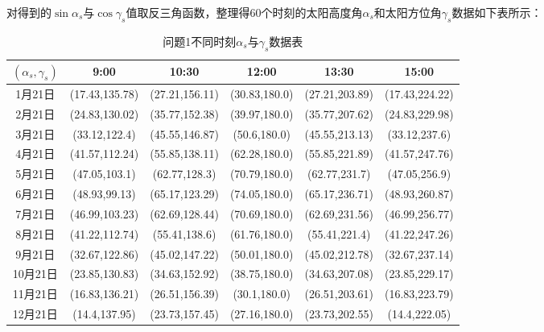 \documentclass{article}
\numberwithin{equation}{subsection}
\begin{document}
\vskip 0.25cm
对得到的$\sin \alpha_s$与$\cos \gamma_s$值取反三角函数，整理得60个时刻的太阳高度角$\alpha_s$和太阳方位角$\gamma_s$数据如下表所示：
\newpage
\begin{table}[!htbp]
    \centering
    \begin{tabular}{|c|c|c|c|c|c|}\hline
        $(\alpha_s,\gamma_s)$&9:00&10:30&12:00&13:30&15:00\\\hline
        1月21日&(17.43,135.78)&	(27.21,156.11)&	(30.83,180.0)&	(27.21,203.89)&	(17.43,224.22)\\
        2月21日&(24.83,130.02)&	(35.77,152.38)&	(39.97,180.0)&	(35.77,207.62)	&(24.83,229.98)\\
        3月21日&(33.12,122.4)&	(45.55,146.87)&	(50.6,180.0)	&(45.55,213.13)&	(33.12,237.6)\\
        4月21日&(41.57,112.24)&	(55.85,138.11)&	(62.28,180.0)&	(55.85,221.89)&	(41.57,247.76)\\
        5月21日&(47.05,103.1)&	(62.77,128.3)	&(70.79,180.0)	&(62.77,231.7)&	(47.05,256.9)\\
        6月21日&(48.93,99.13)&	(65.17,123.29)&	(74.05,180.0)&	(65.17,236.71)&	(48.93,260.87)\\
        7月21日&(46.99,103.23)&	(62.69,128.44)&	(70.69,180.0)&	(62.69,231.56)&	(46.99,256.77)\\
        8月21日&(41.22,112.74)&	(55.41,138.6)	&(61.76,180.0)&	(55.41,221.4)&	(41.22,247.26)\\
        9月21日&(32.67,122.86)&	(45.02,147.22)	&(50.01,180.0)&	(45.02,212.78)&	(32.67,237.14)\\
        10月21日&(23.85,130.83)&	(34.63,152.92)&	(38.75,180.0)&	(34.63,207.08)&	(23.85,229.17)\\
        11月21日&(16.83,136.21)&	(26.51,156.39)&	(30.1,180.0)&	(26.51,203.61)&	(16.83,223.79)\\
        12月21日&(14.4,137.95)&	(23.73,157.45)&	(27.16,180.0)	&(23.73,202.55)	&(14.4,222.05)\\
        \hline
    \end{tabular}
    \caption{问题1不同时刻$\alpha_s$与$\gamma_s$数据表}
\end{table}
\end{document}
